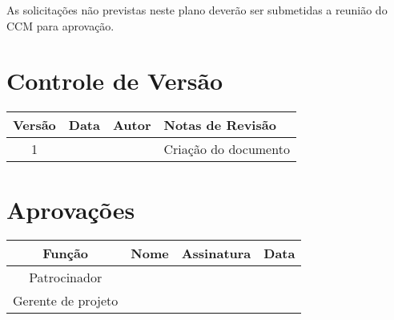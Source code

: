 As solicitações não previstas neste plano deverão ser submetidas a reunião do CCM para aprovação.

\section{Controle de Versão}

\begin{table}[H]
	\begin{tabularx}{\textwidth}{| c | c | X | X |}
		\hline
		\textbf{Versão} & \textbf{Data} & \textbf{Autor}      & \textbf{Notas de Revisão} \\
		\hline
		1                &               & \projectManagerName & Criação do documento     \\
		\hline
	\end{tabularx}
	\centering
\end{table}

\section{Aprovações}

\begin{table}[H]
	\begin{tabularx}{\textwidth}{| c | c | X | c |}
		\hline
		\textbf{Função}  & \textbf{Nome}       & \textbf{Assinatura}      & \textbf{Data} \\
		\hline
		Patrocinador       & \projectSponsorName & \projectSponsorSignature &               \\
		\hline
		Gerente de projeto & \projectManagerName & \projectManagerSignature &               \\
		\hline
	\end{tabularx}
	\centering
\end{table}